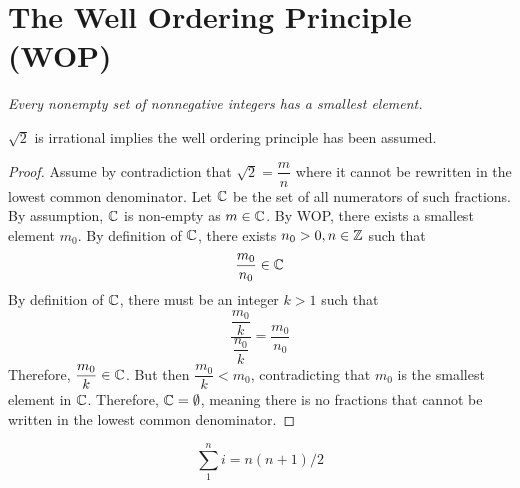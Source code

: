 \chapter{The Well Ordering Principle (WOP)}

\begin{center}
    \emph{Every nonempty set of nonnegative integers has a smallest element.}
\end{center}

\begin{claim}
    $\sqrt{2}$ is irrational implies the well ordering principle has been assumed.
\end{claim}

\begin{proof}
    Assume by contradiction that $\sqrt{2} = \dfrac{m}{n}$ where it cannot be rewritten
    in the lowest common denominator. Let $\mathbb{C}$ be the set of all numerators of such fractions.
    By assumption, $\mathbb{C}$ is non-empty as $m \in \mathbb{C}$. By WOP, there exists a smallest element
    $m_{0}$. By definition of $\mathbb{C}$, there exists $n_{0} > 0, n \in \mathbb{Z}$ such that
    \begin{equation*}
        \dfrac{m_0}{n_0} \in \mathbb{C}
    \end{equation*}
    By definition of $\mathbb{C}$, there must be an integer $k > 1$ such that
    \begin{equation*}
        \dfrac{\dfrac{m_0}{k}}{\dfrac{n_0}{k}} = \dfrac{m_0}{n_0}
    \end{equation*}
    Therefore, $\dfrac{m_0}{k} \in \mathbb{C}$. But then $\dfrac{m_0}{k} < m_0$, contradicting
    that $m_0$ is the smallest element in $\mathbb{C}$. Therefore, $\mathbb{C} = \emptyset$, meaning
    there is no fractions that cannot be written in the lowest common denominator.
\end{proof}

\begin{claim}
    \begin{equation} \label{eq:2.1}
        \sum_{1}^{n} i = n(n+1)/2
    \end{equation}
\end{claim}

